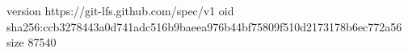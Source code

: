 version https://git-lfs.github.com/spec/v1
oid sha256:ccb3278443a0d741adc516b9baeea976b44bf75809f510d2173178b6ec772a56
size 87540

